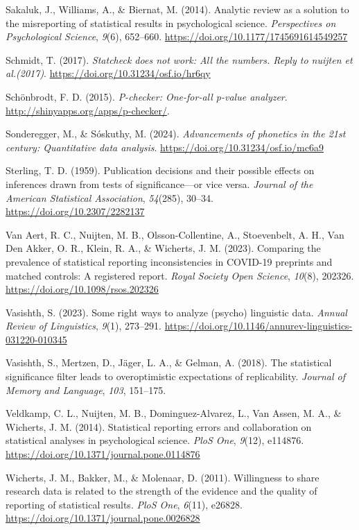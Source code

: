 \documentclass[
  doc,
  longtable,
  nolmodern,
  notxfonts,
  notimes,
  colorlinks=true,linkcolor=blue,citecolor=blue,urlcolor=blue]{apa7}
\newlength{\cslhangindent}
\newenvironment{CSLReferences}[2] %
 {\begin{list}{}{%
  \setlength{\itemindent}{0pt}
  \setlength{\leftmargin}{0pt}
  \setlength{\parsep}{0pt}
  \ifodd #1
   \setlength{\leftmargin}{\cslhangindent}
   \setlength{\itemindent}{-1\cslhangindent}
  \fi
  \setlength{\itemsep}{#2\baselineskip}}}
 {\end{list}}
\begin{document}
\begin{CSLReferences}{1}{0}
Sakaluk, J., Williams, A., \& Biernat, M. (2014). Analytic review as a
solution to the misreporting of statistical results in psychological
science. \emph{Perspectives on Psychological Science}, \emph{9}(6),
652--660. \url{https://doi.org/10.1177/1745691614549257}

Schmidt, T. (2017). \emph{Statcheck does not work: All the numbers.
Reply to nuijten et al.(2017)}.
\url{https://doi.org/10.31234/osf.io/hr6qy}

Schönbrodt, F. D. (2015). \emph{P-checker: One-for-all p-value
analyzer}. \url{http://shinyapps.org/apps/p-checker/}.

Sonderegger, M., \& Sóskuthy, M. (2024). \emph{Advancements of phonetics
in the 21st century: Quantitative data analysis}.
\url{https://doi.org/10.31234/osf.io/mc6a9}

Sterling, T. D. (1959). Publication decisions and their possible effects
on inferences drawn from tests of significance---or vice versa.
\emph{Journal of the American Statistical Association}, \emph{54}(285),
30--34. \url{https://doi.org/10.2307/2282137}

Van Aert, R. C., Nuijten, M. B., Olsson-Collentine, A., Stoevenbelt, A.
H., Van Den Akker, O. R., Klein, R. A., \& Wicherts, J. M. (2023).
Comparing the prevalence of statistical reporting inconsistencies in
COVID-19 preprints and matched controls: A registered report.
\emph{Royal Society Open Science}, \emph{10}(8), 202326.
\url{https://doi.org/10.1098/rsos.202326}

Vasishth, S. (2023). Some right ways to analyze (psycho) linguistic
data. \emph{Annual Review of Linguistics}, \emph{9}(1), 273--291.
\url{https://doi.org/10.1146/annurev-linguistics-031220-010345}

Vasishth, S., Mertzen, D., Jäger, L. A., \& Gelman, A. (2018). The
statistical significance filter leads to overoptimistic expectations of
replicability. \emph{Journal of Memory and Language}, \emph{103},
151--175.

Veldkamp, C. L., Nuijten, M. B., Dominguez-Alvarez, L., Van Assen, M.
A., \& Wicherts, J. M. (2014). Statistical reporting errors and
collaboration on statistical analyses in psychological science.
\emph{PloS One}, \emph{9}(12), e114876.
\url{https://doi.org/10.1371/journal.pone.0114876}

Wicherts, J. M., Bakker, M., \& Molenaar, D. (2011). Willingness to
share research data is related to the strength of the evidence and the
quality of reporting of statistical results. \emph{PloS One},
\emph{6}(11), e26828. \url{https://doi.org/10.1371/journal.pone.0026828}

\end{CSLReferences}
\end{document}
